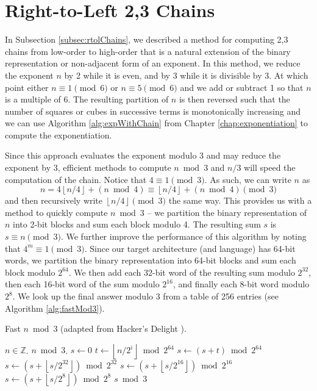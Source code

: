 \documentclass{ucalgthes1}
\theoremstyle{definition}
\newcommand{\ZZ}{\mathbb{Z}}
\newcommand{\floor}[1]{\left\lfloor #1 \right\rfloor}
\begin{document}
\section{Right-to-Left 2,3 Chains}

In Subsection \ref{subsec:rtolChains}, we described a method for computing 2,3 chains from low-order to high-order that is a natural extension of the binary representation or non-adjacent form of an exponent.  In this method, we reduce the exponent $n$ by 2 while it is even, and by 3 while it is divisible by 3.  At which point either $n \equiv 1 \pmod 6$ or $n \equiv 5 \pmod 6$ and we add or subtract 1 so that $n$ is a multiple of 6.  The resulting partition of $n$ is then reversed such that the number of squares or cubes in successive terms is monotonically increasing and we can use Algorithm \ref{alg:expWithChain} from Chapter \ref{chap:exponentiation} to compute the exponentiation.

Since this approach evaluates the exponent modulo 3 and may reduce the exponent by 3, efficient methods to compute $n \bmod 3$ and $n/3$ will speed the computation of the chain. Notice that $4 \equiv 1 \pmod 3$.  As such, we can write $n$ as
\[
n = 4 \floor{n/4} + (n \bmod 4) \equiv \floor{n/4} + (n \bmod 4) \pmod 3
\]
and then recursively write $\floor{n/4} \pmod 3$ the same way. This provides us with a method to quickly compute $n \bmod 3$ -- we partition the binary representation of $n$ into \mbox{2-bit} blocks and sum each block modulo 4.  The resulting sum $s$ is $s \equiv n \pmod 3$.  We further improve the performance of this algorithm by noting that $4^m \equiv 1 \pmod 3$.  Since our target architecture (and language) has 64-bit words, we partition the binary representation into 64-bit blocks and sum each block modulo $2^{64}$.  We then add each 32-bit word of the resulting sum modulo $2^{32}$, then each 16-bit word of the sum modulo $2^{16}$, and finally each 8-bit word modulo $2^8$.  We look up the final answer modulo 3 from a table of 256 entries (see Algorithm \ref{alg:fastMod3}).

\begin{algorithm}[h]
\caption{Fast $n \bmod 3$ (adapted from Hacker's Delight \cite{Warren2002}).}
\label{alg:fastMod3}
\begin{algorithmic}[1]
\REQUIRE $n \in \ZZ$.
\ENSURE $n \bmod 3$.
\STATE $s \gets 0$
\FOR {$i$ from $0$ to $\floor{\log_2 n}$ by 64}
	\STATE $t \gets \floor{n / 2^i} \bmod {2^{64}}$
	\STATE $s \gets (s + t) \bmod {2^{64}}$
\ENDFOR
\STATE $s \gets \left(s + \floor{s/{2^{32}}} \right) \bmod {2^{32}}$
\STATE $s \gets \left(s + \floor{s/{2^{16}}} \right) \bmod {2^{16}}$
\STATE $s \gets \left(s + \floor{s/{2^{8}}} \right) \bmod {2^{8}}$
\RETURN $s \bmod 3$ 
\end{algorithmic}
\end{algorithm}
\end{document}
